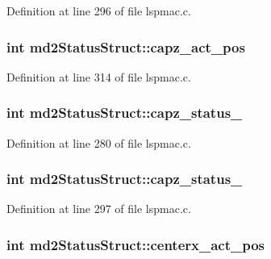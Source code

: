 Definition at line 296 of file lspmac.\-c.

\hypertarget{structmd2StatusStruct_a257c04efac3a33d5d34b21d64c6f1266}{
\subsubsection[{capz\-\_\-act\-\_\-pos}]{\setlength{\rightskip}{0pt plus 5cm}int md2\-Status\-Struct\-::capz\-\_\-act\-\_\-pos}}\label{structmd2StatusStruct_a257c04efac3a33d5d34b21d64c6f1266}


Definition at line 314 of file lspmac.\-c.

\hypertarget{structmd2StatusStruct_a719db4477f35331eaa8b7b44150e88a2}{
\subsubsection[{capz\-\_\-status\-\_\-1}]{\setlength{\rightskip}{0pt plus 5cm}int md2\-Status\-Struct\-::capz\-\_\-status\-\_}}\label{structmd2StatusStruct_a719db4477f35331eaa8b7b44150e88a2}


Definition at line 280 of file lspmac.\-c.

\hypertarget{structmd2StatusStruct_a3abb998bb89433aed16121d0dae6275a}{
\subsubsection[{capz\-\_\-status\-\_\-2}]{\setlength{\rightskip}{0pt plus 5cm}int md2\-Status\-Struct\-::capz\-\_\-status\-\_}}\label{structmd2StatusStruct_a3abb998bb89433aed16121d0dae6275a}


Definition at line 297 of file lspmac.\-c.

\hypertarget{structmd2StatusStruct_ae7924b6e91e1de82f6f7910cb3a9c9bd}{
\subsubsection[{centerx\-\_\-act\-\_\-pos}]{\setlength{\rightskip}{0pt plus 5cm}int md2\-Status\-Struct\-::centerx\-\_\-act\-\_\-pos}}\label{structmd2StatusStruct_ae7924b6e91e1de82f6f7910cb3a9c9bd}


